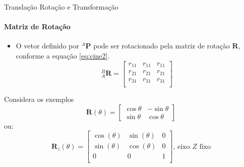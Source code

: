 \documentclass{beamer}
\begin{document}
\begin{frame}{{Translação Rotação e Transformação}}
  \framesubtitle{Matriz de Rotação}
  \begin{itemize}
    \item O vetor definido por ${}^A\mathbf{P}$ pode ser rotacionado pela matriz de rotação $\mathbf{R}$, conforme a equação \eqref{eq:cine2}.
    \begin{equation}\label{eq:cine2}
        {}_A^B
        \mathbf{R} = 
        \begin{bmatrix}
        r_{11} & r_{11} & r_{11}\\
        r_{21} & r_{21} & r_{21}\\
        r_{31} & r_{31} & r_{31}\\
        \end{bmatrix}
        \end{equation}
\end{itemize}

\begin{block}{Considera os exemplos}
    \begin{equation*}
        \mathbf{R}(\theta) = 
        \begin{bmatrix}
            \cos \theta &-\sin \theta \\\sin \theta &\cos \theta
        \end{bmatrix}
        \end{equation*}
    ou:
    \begin{equation*}
        \mathbf{R}_z(\theta) = 
        \begin{bmatrix}
        \cos(\theta) & \sin(\theta) & 0\\
        \sin(\theta) & \cos(\theta) & 0\\
        0 & 0 & 1\\ 
        \end{bmatrix} \text{, eixo $Z$ fixo}
        \end{equation*}
\end{block}

\end{frame}
\end{document}
